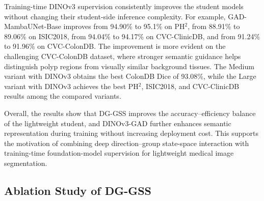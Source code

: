 Training-time DINOv3 supervision consistently improves the student models without changing their student-side inference complexity. For example, GAD-MambaUNet-Base improves from 94.90\% to 95.1\% on PH$^2$, from 88.91\% to 89.06\% on ISIC2018, from 94.04\% to 94.17\% on CVC-ClinicDB, and from 91.24\% to 91.96\% on CVC-ColonDB. The improvement is more evident on the challenging CVC-ColonDB dataset, where stronger semantic guidance helps distinguish polyp regions from visually similar background tissues. The Medium variant with DINOv3 obtains the best ColonDB Dice of 93.08\%, while the Large variant with DINOv3 achieves the best PH$^2$, ISIC2018, and CVC-ClinicDB results among the compared variants.

Overall, the results show that DG-GSS improves the accuracy--efficiency balance of the lightweight student, and DINOv3-GAD further enhances semantic representation during training without increasing deployment cost. This supports the motivation of combining deep direction--group state-space interaction with training-time foundation-model supervision for lightweight medical image segmentation.






\subsection{Ablation Study of DG-GSS}




